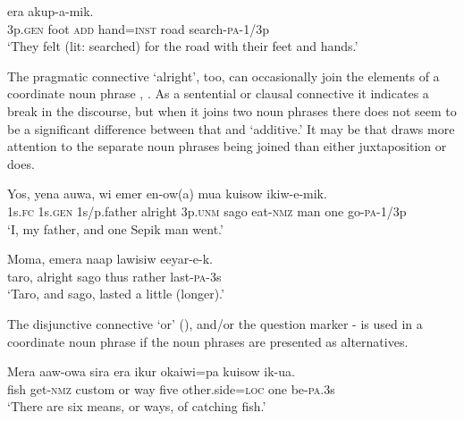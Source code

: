 \ea%
\label{ex:4:x894}
\gll {}     era  akup-a-mik. \\
    3p.\textsc{gen}  foot  \textsc{add}  hand=\textsc{inst}  road  search-\textsc{pa}-1/3p  \\
\glt`They felt (lit: searched) for the road with their feet and hands.'
\z

The pragmatic connective  `alright', too, can occasionally join the elements of a coordinate noun phrase , . As a sentential or clausal connective it indicates a break in the discourse, but when it joins two noun phrases there does not seem to be a significant difference between that and  `additive.' It may be that  draws more attention to the separate noun phrases being joined than either juxtaposition or  does.

\ea%
\label{ex:4:x815}
\gll Yos,  yena  auwa,    wi  emer  en-ow(a)  mua  kuisow  ikiw-e-mik.\\
     1s.\textsc{fc}  1s.\textsc{gen}  1s/p.father  alright  3p.\textsc{unm}  sago  eat-\textsc{nmz}  man one  go-\textsc{pa}-1/3p\\
\glt`I, my father, and one Sepik man went.'
\z

\ea%
\label{ex:4:x816}
\gll Moma,    emera  naap  lawisiw  eeyar-e-k. \\
   taro,  alright  sago  thus  rather  last-\textsc{pa}-3s   \\
\glt`Taro, and sago, lasted a little (longer).'
\z

The disjunctive connective  `or'  (), and/or the question marker -    is used in a coordinate noun phrase if the noun phrases are presented as alternatives. 

\ea%
\label{ex:4:x817}
\gll Mera  aaw-owa  sira    era  ikur  okaiwi=pa  kuisow ik-ua. \\
   fish  get-\textsc{nmz}  custom  or  way  five  other.side=\textsc{loc}  one   be-\textsc{pa}.3s  \\
\glt`There are six means, or ways, of catching fish.'
\z

